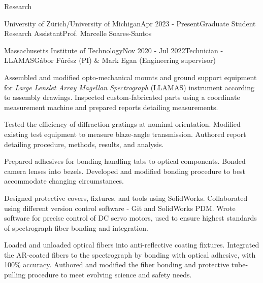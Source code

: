 \documentclass{resume} %
\begin{document}
\begin{rSection}{Research}
\begin{rSubsection}{University of Zürich/University of Michigan}{Apr 2023 - Present}{Graduate Student Research Assistant}{Prof. Marcelle Soares-Santos}
\begin{rSubsection}{Massachusetts Institute of Technology}{Nov 2020 - Jul 2022}{Technician - LLAMAS}{G\'abor F\^ur\'esz (PI) \& Mark Egan (Engineering supervisor)}
\item Assembled and modified opto-mechanical mounts and ground support equipment for \textit{Large Lenslet Array Magellan Spectrograph} (LLAMAS) instrument according to assembly drawings. Inspected custom-fabricated parts using a coordinate measurement machine and prepared reports detailing measurements.
\item Tested the efficiency of diffraction gratings at nominal orientation. Modified existing test equipment to measure blaze-angle transmission. Authored report detailing procedure, methods, results, and analysis.
\item Prepared  adhesives for bonding handling tabs to optical components. Bonded camera lenses into bezels. Developed and modified bonding procedure to best accommodate changing circumstances. 
\item Designed protective covers, fixtures, and tools using SolidWorks. Collaborated using different version control software - Git and SolidWorks PDM. Wrote software for precise control of DC servo motors, used to ensure highest standards of spectrograph fiber bonding and integration.
\item Loaded and unloaded optical fibers into anti-reflective coating fixtures. Integrated the AR-coated fibers to the spectrograph by bonding with optical adhesive, with 100\% accuracy. Authored and modified the fiber bonding and protective tube-pulling procedure to meet evolving science and safety needs.
\end{rSubsection}



\end{rSubsection}
\end{rSection}
\end{document}
